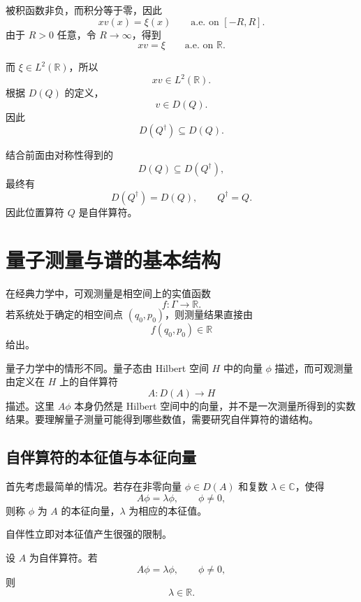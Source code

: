 \documentclass[UTF8,a4paper,11pt,openany]{ctexbook}
\begin{document}
\begin{proofblock}
被积函数非负，而积分等于零，因此
\[
xv(x)=\xi(x)
\qquad
\text{a.e. on }[-R,R].
\]
由于 $R>0$ 任意，令 $R\to\infty$，得到
\begin{equation}
    xv=\xi
    \qquad
    \text{a.e. on }\mathbb R.
\end{equation}

而 $\xi\in L^2(\mathbb R)$，所以
\[
xv\in L^2(\mathbb R).
\]
根据 $D(Q)$ 的定义，
\[
v\in D(Q).
\]
因此
\begin{equation}
    D(Q^\dagger)\subseteq D(Q).
\end{equation}

结合前面由对称性得到的
\[
D(Q)\subseteq D(Q^\dagger),
\]
最终有
\begin{equation}
    D(Q^\dagger)=D(Q),
    \qquad
    Q^\dagger=Q.
\end{equation}
因此位置算符 $Q$ 是自伴算符。
\end{proofblock}

\section{量子测量与谱的基本结构}

在经典力学中，可观测量是相空间上的实值函数
\[
f:\Gamma\to\mathbb R.
\]
若系统处于确定的相空间点 $(q_0,p_0)$，则测量结果直接由
\[
f(q_0,p_0)\in\mathbb R
\]
给出。

量子力学中的情形不同。量子态由 Hilbert 空间 $H$ 中的向量 $\phi$ 描述，而可观测量由定义在 $H$ 上的自伴算符
\[
A:D(A)\to H
\]
描述。这里 $A\phi$ 本身仍然是 Hilbert 空间中的向量，并不是一次测量所得到的实数结果。要理解量子测量可能得到哪些数值，需要研究自伴算符的谱结构。

\subsection{自伴算符的本征值与本征向量}

首先考虑最简单的情况。若存在非零向量 $\phi\in D(A)$ 和复数 $\lambda\in\mathbb C$，使得
\begin{equation}
    A\phi=\lambda\phi,
    \qquad
    \phi\neq0,
\end{equation}
则称 $\phi$ 为 $A$ 的本征向量，$\lambda$ 为相应的本征值。

自伴性立即对本征值产生很强的限制。

\begin{proposition}[自伴算符的本征值为实数]
设 $A$ 为自伴算符。若
\[
A\phi=\lambda\phi,
\qquad
\phi\neq0,
\]
则
\[
\lambda\in\mathbb R.
\]
\end{proposition}
\end{document}
